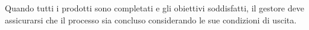 \documentclass[../../norme-di-progetto.tex]{subfiles}
\begin{document}
Quando tutti i prodotti sono completati e gli obiettivi soddisfatti, il gestore deve assicurarsi che il processo sia concluso considerando le sue condizioni di uscita.



\end{document}
